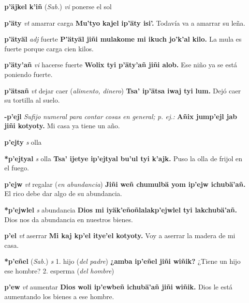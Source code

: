 \documentclass[10pt]{scrbook}
\newcommand{\entry}[1]{\textbf{#1}}
\newcommand{\onedefinition}[1]{#1.}
\newcommand{\nontranslationdef}[1]{\textit{#1}}
\newcommand{\partofspeech}[1]{\textit{#1}}
\newcommand{\spanishtranslation}[1]{#1}
\newcommand{\clarification}[1]{(\textit{#1})}
\newcommand{\cholexample}[1]{\textbf{#1}}
\newcommand{\exampletranslation}[1]{#1}
\newcommand{\relevantdialect}[1]{(\textit{#1})}
\begin{document}
\begin{multicols}{2}
\entry{p'äjkel k'iñ}
\relevantdialect{Sab.}
\partofspeech{vi}
\spanishtranslation{ponerse el sol}

\entry{p'äty}
\partofspeech{vt}
\spanishtranslation{amarrar carga}
\cholexample{Mu'tyo kajel ip'äty isi'.}
\exampletranslation{Todavía va a amarrar su leña.}

\entry{p'ätyäl}
\partofspeech{adj}
\spanishtranslation{fuerte}
\cholexample{P'ätyäl jiñi mulakome mi ikuch jo'k'al kilo.}
\exampletranslation{La mula es fuerte porque carga cien kilos.}

\entry{p'äty'añ}
\partofspeech{vi}
\spanishtranslation{hacerse fuerte}
\cholexample{Wolix tyi p'äty'añ jiñi alob.}
\exampletranslation{Ese niño ya se está poniendo fuerte.}

\entry{p'ätsañ}
\partofspeech{vt}
\spanishtranslation{dejar caer}
\clarification{alimento, dinero}
\cholexample{Tsa' ip'ätsa iwaj tyi lum.}
\exampletranslation{Dejó caer su tortilla al suelo.}

\entry{-p'ejl}
\nontranslationdef{Sufijo numeral para contar cosas en general; p. ej.:}
\cholexample{Añix jump'ejl jab jiñi kotyoty.}
\exampletranslation{Mi casa ya tiene un año.}

\entry{p'ejty}
\partofspeech{s}
\spanishtranslation{olla}

\entry{*p'ejtyal}
\partofspeech{s}
\spanishtranslation{olla}
\cholexample{Tsa' ijetye ip'ejtyal bu'ul tyi k'ajk.}
\exampletranslation{Puso la olla de frijol en el fuego.}

\entry{p'ejw}
\partofspeech{vt}
\spanishtranslation{regalar}
\clarification{en abundancia}
\cholexample{Jiñi weñ chumulbä yom ip'ejw ichubä'añ.}
\exampletranslation{El rico debe dar algo de su abundancia.}

\entry{*p'ejwlel}
\partofspeech{s}
\spanishtranslation{abundancia}
\cholexample{Dios mi iyäk'eñoñlalakp'ejwlel tyi lakchubä'añ.}
\exampletranslation{Dios nos da abundancia en nuestros bienes.}

\entry{p'el}
\partofspeech{vt}
\spanishtranslation{aserrar}
\cholexample{Mi kaj kp'el itye'el kotyoty.}
\exampletranslation{Voy a aserrar la madera de mi casa.}

\entry{*p'eñel}
\relevantdialect{Sab.}
\partofspeech{s}
\onedefinition{1}
\spanishtranslation{hijo}
\clarification{del padre}
\cholexample{¿amba ip'eñel jiñi wiñik?}
\exampletranslation{¿Tiene un hijo ese hombre?}
\onedefinition{2}
\spanishtranslation{esperma}
\clarification{del hombre}

\entry{p'ew}
\partofspeech{vt}
\spanishtranslation{aumentar}
\cholexample{Dios woli ip'ewbeñ ichubä'añ jiñi wiñik.}
\exampletranslation{Dios le está aumentando los bienes a ese hombre.}


\end{multicols}
\end{document}
